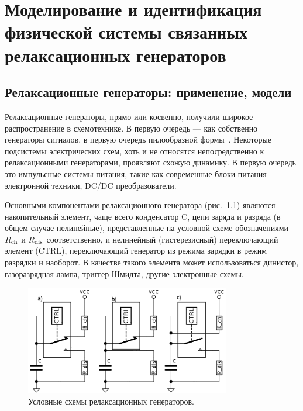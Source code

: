 \chapter{Моделирование и идентификация физической системы связанных релаксационных генераторов}

\newcommand{\RelaxBjtIi}{системы из трёх связанных релаксационных генераторов на паре комплиментарных транзисторов}
\newcommand{\RelaxShIi}{системы из трёх связанных релаксационных генераторов на основе триггеров Шмидта}

\section{Релаксационные генераторы: применение, модели}


Релаксационные генераторы, прямо или косвенно, получили широкое распространение
в схемотехнике. В первую очередь --- как собственно генераторы
сигналов, в первую очередь пилообразной формы~\cite{horowitz,mishenko_du_small_relax}.
Некоторые подсистемы электрических схем, хоть и не относятся непосредственно к
релаксационными генераторами, проявляют схожую динамику.
В первую очередь это импульсные системы питания, такие как
современные блоки питания электронной техники, DC/DC преобразователи.

Основными компонентами релаксационного генератора
(рис.~\ref{atu:f:relax_types})
являются
накопительный элемент, чаще всего конденсатор C,
цепи заряда и разряда (в общем случае нелинейные),
представленные на условной схеме обозначениями
$R_\mathrm{ch}$ и $R_\mathrm{dis}$ соответственно,
и нелинейный (гистерезисный) переключающий элемент (CTRL),
переключающий генератор из режима зарядки в режим разрядки и наоборот.
В качестве такого элемента может использоваться
динистор, газоразрядная лампа, триггер Шмидта,
другие электронные схемы.

\begin{figure}[htb!]
  \centerline{\includegraphics[width=0.8\textwidth]{p/relax_types.png} }
  \caption{Условные схемы релаксационных генераторов.}
  \label{atu:f:relax_types}
\end{figure}

